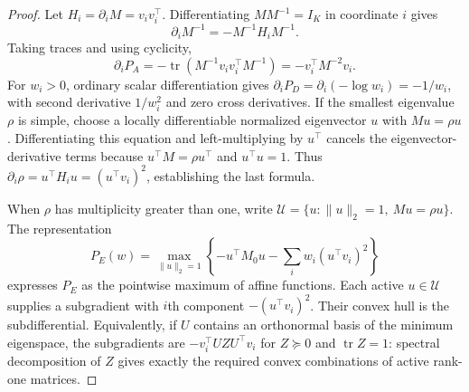\documentclass[11pt]{article}
\newcommand{\tr}{\operatorname{tr}}
\begin{document}
\begin{proof}
Let $H_i=\partial_iM=v_iv_i^\top$. Differentiating $MM^{-1}=I_K$ in coordinate $i$ gives
\begin{equation*}
 \partial_iM^{-1}=-M^{-1}H_iM^{-1}.
\end{equation*}
Taking traces and using cyclicity,
\begin{equation*}
 \partial_iP_A=-\tr(M^{-1}v_iv_i^\top M^{-1})
 =-v_i^\top M^{-2}v_i.
\end{equation*}
For $w_i>0$, ordinary scalar differentiation gives $\partial_iP_D=\partial_i(-\log w_i)=-1/w_i$, with second derivative $1/w_i^2$ and zero cross derivatives. If the smallest eigenvalue $\rho$ is simple, choose a locally differentiable normalized eigenvector $u$ with $Mu=\rho u$. Differentiating this equation and left-multiplying by $u^\top$ cancels the eigenvector-derivative terms because $u^\top M=\rho u^\top$ and $u^\top u=1$. Thus $\partial_i\rho=u^\top H_i u=(u^\top v_i)^2$, establishing the last formula.

When $\rho$ has multiplicity greater than one, write $\mathcal U=\{u:\|u\|_2=1,\ Mu=\rho u\}$. The representation
\begin{equation*}
P_E(w)=\max_{\|u\|_2=1}\left\{-u^\top M_0u-\sum_iw_i(u^\top v_i)^2\right\}
\end{equation*}
expresses $P_E$ as the pointwise maximum of affine functions. Each active $u\in\mathcal U$ supplies a subgradient with $i$th component $-(u^\top v_i)^2$. Their convex hull is the subdifferential. Equivalently, if $U$ contains an orthonormal basis of the minimum eigenspace, the subgradients are $-v_i^\top UZU^\top v_i$ for $Z\succeq0$ and $\tr Z=1$: spectral decomposition of $Z$ gives exactly the required convex combinations of active rank-one matrices.


\end{proof}
\end{document}
